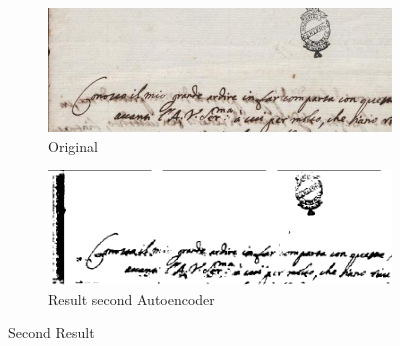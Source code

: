 \documentclass[%
 reprint,
 amsmath,amssymb,
 aps,
]{revtex4-1}
\begin{document}
\begin{figure}%
\centering
\begin{subfigure}{.9\columnwidth}
\includegraphics[width=\columnwidth]{second}%
\caption{Original}%
\label{subfiga}%
\end{subfigure}\hfill%
\begin{subfigure}{.9\columnwidth}
\includegraphics[width=\columnwidth]{secondAuto}%
\caption{Result second Autoencoder}%
\label{subfigb}%
\end{subfigure}\hfill%
\caption{Second Result}
\label{figabc}
\end{figure}


\clearpage

%
\end{document}
